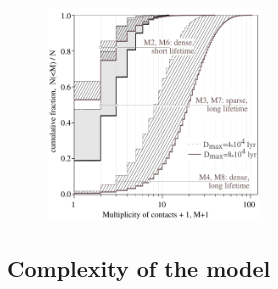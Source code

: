 
\begin{figure} \centering
   \includegraphics[width=0.5\textwidth]{F_number_of_contacts.pdf}
    \label{F_number_of_contacts}
\end{figure}
        
 

\subsection{Complexity of the model}

